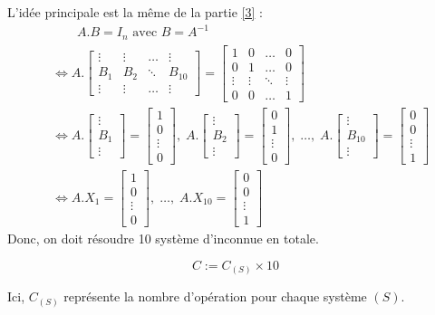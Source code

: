 \documentclass{article}
\begin{document}
L'idée principale est la même de la partie \ref{3} : 
\begin{align*}
    &\quad\quad  A.B = I_n \text{ avec } B = A^{-1}  \\
    &\iff  A. \begin{bmatrix} \vdots & \vdots & \ldots & \vdots \\ B_1 & B_2 & \ddots & B_{10} \\ \vdots & \vdots & \ldots & \vdots \end{bmatrix}  = \begin{bmatrix} 1 & 0 & \ldots & 0 \\ 0 & 1 & \ldots & 0 \\ \vdots & \vdots & \ddots & \vdots \\ 0 & 0 & \ldots & 1\end{bmatrix} \\
    &\iff        A.\begin{bmatrix} \vdots \\ B_1 \\ \vdots\end{bmatrix}  = \begin{bmatrix} 1 \\ 0 \\ \vdots \\ 0  \end{bmatrix}, \;
        A.\begin{bmatrix} \vdots \\ B_2 \\ \vdots \end{bmatrix}  = \begin{bmatrix} 0 \\ 1 \\ \vdots \\ 0 \end{bmatrix}, \; \ldots, \;
        A.\begin{bmatrix} \vdots \\ B_{10} \\ \vdots \end{bmatrix}  = \begin{bmatrix} 0 \\ 0 \\ \vdots \\ 1 \end{bmatrix} \\
    &\iff A.X_1 = \begin{bmatrix} 1 \\ 0\\ \vdots \\ 0 \end{bmatrix},\; \ldots,\; A.X_{10} = \begin{bmatrix} 0 \\ 0 \\ \vdots \\ 1 \end{bmatrix} 
\end{align*}
Donc, on doit résoudre 10 système d'inconnue en totale. 
\begin{tcolorbox}
\[
    C := C_{(S)} \times  10
\]
 
Ici, $C_{(S)}$ représente la nombre d'opération pour chaque système $(S)$.
\end{tcolorbox}
\end{document}
